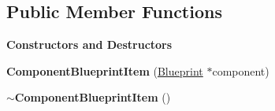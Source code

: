 \subsection*{Public Member Functions}
\begin{Indent}\textbf{ Constructors and Destructors}\par
\begin{DoxyCompactItemize}
\item 
\mbox{\label{classrev_1_1_view_1_1_component_blueprint_item_aac1c38f8cff9738db7c1c2ec3461526b}} 
{\bfseries Component\+Blueprint\+Item} (\mbox{\hyperlink{classrev_1_1_blueprint}{Blueprint}} $\ast$component)
\item 
\mbox{\label{classrev_1_1_view_1_1_component_blueprint_item_a7669f0b5ed895f1c3f517e7d5c11f463}} 
{\bfseries $\sim$\+Component\+Blueprint\+Item} ()
\end{DoxyCompactItemize}
\end{Indent}
